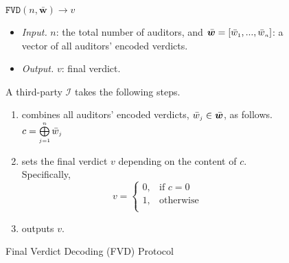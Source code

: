 \begin{figure}[H]
\setlength{\fboxsep}{1pt}
\begin{center}
    \begin{tcolorbox}[enhanced,width=5.5in, height=67mm,
    drop fuzzy shadow southwest,
    colframe=black,colback=white]
\underline{$\mathtt{FVD}(n,  \bar{\bm w})\rightarrow  v$}\\
%
\begin{itemize}
\item \noindent\textit{Input.} $n$:  the total number of  auditors,  and  $\bar{\bm w}=[\bar{ w}_{\scriptscriptstyle 1},..., \bar{ w}_{\scriptscriptstyle n}]$:  a vector of all auditors' encoded  verdicts.
%
\item \noindent\textit{Output.} $v$: final verdict.  
%
\end{itemize}
A third-party $\mathcal{I}$ takes the following steps.
\begin{enumerate}
%
\item combines  all auditors' encoded verdicts, $\bar w_{\scriptscriptstyle j}\in \bar{\bm {w}}$, as follows. 
%
$c= \bigoplus\limits^{\scriptscriptstyle n}_{\scriptscriptstyle j=1} \bar w_{\scriptscriptstyle j}$
%
\item sets the final verdict $v$ depending on the content of $c$. Specifically, 
%
\begin{equation*}
   v= 
\begin{cases}
    0,              &\text{if } c= 0\\
   1 ,& \text{otherwise }\\
\end{cases}
\end{equation*}
%
\item outputs  $v$. 
 \end{enumerate}
\end{tcolorbox}
\end{center}
\caption{Final Verdict Decoding  (FVD) Protocol} 
\label{fig:FVD}
\end{figure}







